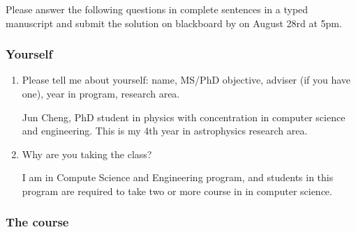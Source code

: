\documentclass{article}
\begin{document}
 
Please answer the following questions in complete sentences in a typed manuscript and submit the solution on blackboard by on August 28rd at 5pm.

\hypertarget{yourself_1}{}\subsubsection*{{Yourself}}\label{yourself_1}

\begin{enumerate}%
\item Please tell me about yourself: name, MS/PhD objective, adviser (if you have one), year in program, research area.

Jun Cheng,   PhD student in physics with concentration in computer science and engineering. This is my 4th year in astrophysics research area. 


\item Why are you taking the class?

I am in Compute Science and Engineering program, and students in this program are required to take two or more course in in computer science. 

\end{enumerate}
\hypertarget{the_course_2}{}\subsubsection*{{The course}}\label{the_course_2}
\end{document}
